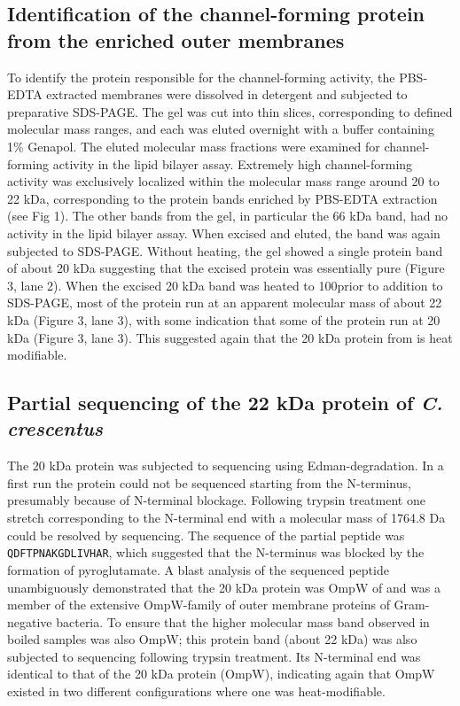 \subsection{Identification of the channel-forming protein from the enriched outer membranes} 
To identify the protein responsible for the channel-forming activity, the \ac{PBS}-\ac{EDTA} extracted membranes were dissolved in detergent and subjected to preparative \ac{SDS-PAGE}. The gel was cut into thin slices, corresponding to defined molecular mass ranges, and each was eluted overnight with a buffer containing 1\% Genapol. The eluted molecular mass fractions were examined for channel-forming activity in the lipid bilayer assay. Extremely high channel-forming activity was exclusively localized within the molecular mass range around 20 to 22 kDa, corresponding to the protein bands enriched by \ac{PBS}-\ac{EDTA} extraction (see Fig 1). The other bands from the gel, in particular the 66 kDa band, had no activity in the lipid bilayer assay. When excised and eluted, the band was again subjected to \ac{SDS-PAGE}. Without heating, the gel showed a single protein band of about 20 kDa suggesting that the excised protein was essentially pure (Figure 3, lane 2). When the excised 20 kDa band was heated to 100\cel prior to addition to \ac{SDS-PAGE}, most of the protein run at an apparent molecular mass of about 22 kDa (Figure 3, lane 3), with some indication that some of the protein run at 20 kDa (Figure 3, lane 3). This suggested again that the 20 kDa protein from \caulobacter is heat modifiable.

\subsection{Partial sequencing of the 22 kDa protein of \textit{C. crescentus}}
The 20 kDa protein was subjected to sequencing using Edman-degradation. In a first run the protein could not be sequenced starting from the N-terminus, presumably because of N-terminal blockage. Following trypsin treatment one stretch corresponding to the N-terminal end with a molecular mass of 1764.8 Da could be resolved by sequencing. The sequence of the partial peptide was \texttt{QDFTPNAKGDLIVHAR}, which suggested that the N-terminus was blocked by the formation of pyroglutamate. A \ac{blast} analysis of the sequenced peptide unambiguously demonstrated that the 20 kDa protein was OmpW of \caulobacter and was a member of the extensive OmpW-family of outer membrane proteins of Gram-negative bacteria. To ensure that the higher molecular mass band observed in boiled samples was also OmpW; this protein band (about 22 kDa) was also subjected to sequencing following trypsin treatment. Its N-terminal end was identical to that of the 20 kDa protein (OmpW), indicating again that OmpW existed in two different configurations where one was heat-modifiable. 

